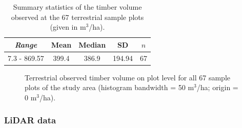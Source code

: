 \begin{table}[H]
	\begin{center}
		\caption{Summary  statistics  of  the  timber  volume  observed  at  the  67  terrestrial sample plots (given in m$^3$/ha).}
		\vspace{0.2cm}
		\label{tab:sumfplots}
		\begin{tabular}{|c|c|c|c|c|}
			\hline
			\multicolumn{1}{|c|}{\textit{Range}} & \multicolumn{1}{c|}{\textbf{Mean}}  & \multicolumn{1}{c|}{\textbf{Median}}  & \multicolumn{1}{c|}{\textbf{SD}}  & \multicolumn{1}{c|}{\textbf{$n$}} \\ %
			\hline \hline
			7.3 - 869.57 & 399.4 & 386.9 & 194.94 & 67 \\ 
			\hline \hline
		\end{tabular} 
	\end{center}
\end{table}

\begin{figure}[H]
	\centering
	\caption{Terrestrial observed timber volume on plot level for all 67 sample plots of the study area (histogram bandwidth = 50 m$^3$/ha; origin = 0 m$^3$/ha).}
	\label{fig:sumfplots}
\end{figure}




\subsubsection{LiDAR data}
\label{sec:lidardata}

